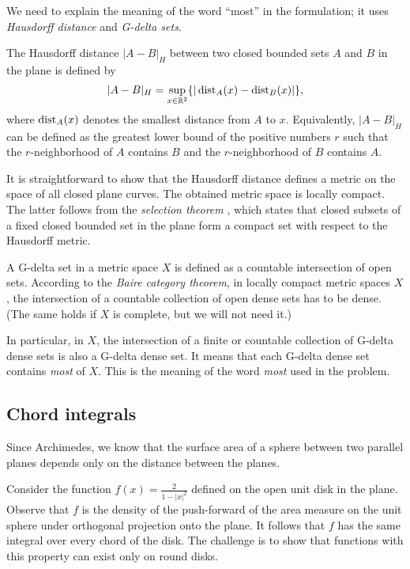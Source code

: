 We need to explain the meaning of the word ``most'' in the formulation;
it uses \emph{Hausdorff distance} and \emph{G-delta sets}.

The Hausdorff distance $|A-B|_H$ between two closed bounded sets $A$ and $B$ in the plane is defined by 
\[|A-B|_H=\sup_{x\in\mathbb{R}^2}\{|\operatorname{\rm dist}\nolimits_A(x)-\operatorname{\rm dist}\nolimits_B(x)|\},\]
where $\operatorname{\rm dist}\nolimits_A(x)$ denotes the smallest distance from $A$ to $x$.
Equivalently, $|A-B|_H$ can be defined as the greatest lower bound of the positive numbers $r$ such that the $r$-neighborhood of $A$ contains $B$ and the $r$-neighborhood of $B$ contains $A$.

It is straightforward to show that the Hausdorff distance defines a metric on the space of all closed plane curves.
The obtained metric space is locally compact.
The latter follows from the \emph{selection theorem} \cite[see \S18 in][]{blaschke},
which states that closed subsets of a fixed closed bounded set in the plane form a compact set with respect to the Hausdorff metric. 

A G-delta set in a metric space $X$ is defined as a countable intersection of open sets.
According to the \emph{Baire category theorem}, 
in locally compact metric spaces $X$,
the intersection of a countable collection of open dense sets 
has to be dense.
(The same holds if $X$ is complete, but we will not need it.)

In particular, in $X$, 
the intersection of a finite or countable collection of G-delta dense sets is also a G-delta dense set. 
It means that each G-delta dense set contains {}\emph{most} of $X$.
This is the meaning of the word {}\emph{most} used in the problem.

\subsection*{Chord integrals}

Since  Archimedes, we know that the surface area of a sphere between two parallel planes depends only on the distance between the planes.

Consider the function $f(x) = \tfrac{2}{1 - |x|^2}$ defined on the open unit disk in the plane.
Observe that $f$ is the density of the push-forward of the area measure on the unit sphere under orthogonal projection onto the plane.
It follows that $f$ has the same integral over every chord of the disk.
The challenge is to show that functions with this property can exist only on round disks.

